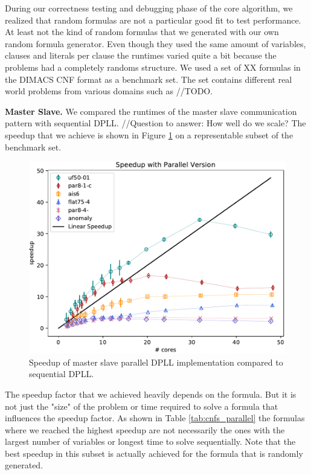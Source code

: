 \documentclass[letterpaper]{article}
\newcommand{\mypar}[1]{{\bf #1.}}
\begin{document}
During our correctness testing and debugging phase of the core algorithm, we realized that random formulas are not a particular good fit to test performance.
At least not the kind of random formulas that we generated with our own random formula generator.
Even though they used the same amount of variables, clauses and literals per clause the runtimes varied quite a bit because the problems had a completely randoms structure.
We used a set of XX formulas in the DIMACS CNF format as a benchmark set.
The set contains different real world problems from various domains such as //TODO.

\mypar{Master Slave}
We compared the runtimes of the master slave communication pattern with sequential DPLL.
//Question to answer: How well do we scale?
The speedup that we achieve is shown in Figure \ref{fig:dpll_parallel_speedup} on a representable subset of the benchmark set.
\begin{figure}
    \centering
    \includegraphics[width=\columnwidth]{figures/dpll_scaling_parallel}
    \caption{Speedup of master slave parallel DPLL implementation compared to sequential DPLL.
    \label{fig:dpll_parallel_speedup}}
\end{figure}
The speedup factor that we achieved heavily depends on the formula.
But it is not just the "size" of the problem or time required to solve a formula that influences the speedup factor.
As shown in Table \ref{tab:cnfs_parallel} the formulas where we reached the highest speedup are not necessarily the ones with the largest number of variables or longest time to solve sequentially.
Note that the best speedup in this subset is actually achieved for the formula that is randomly generated.
\end{document}
